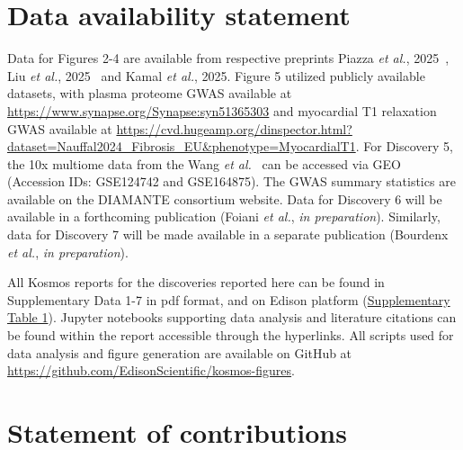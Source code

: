 \documentclass{article}
\begin{document}
\section{Data availability statement}

Data for Figures 2-4 are available from respective preprints Piazza \textit{et al.}, 2025~\cite{piazza_physical_2025}, Liu \textit{et al.}, 2025~\cite{liu_disentangling_2025} and Kamal \textit{et al.}, 2025\cite{kamal_preoptic_2025}. Figure 5 utilized publicly available datasets, with plasma proteome GWAS available at \url{https://www.synapse.org/Synapse:syn51365303} and myocardial T1 relaxation GWAS available at \url{https://cvd.hugeamp.org/dinspector.html?dataset=Nauffal2024_Fibrosis_EU&phenotype=MyocardialT1}. For Discovery 5, the 10x multiome data from the Wang \textit{et al.}~\cite{wang_integrating_2023} can be accessed via GEO (Accession IDs: GSE124742 and GSE164875). The GWAS summary statistics are available on the DIAMANTE consortium website. Data for Discovery 6 will be available in a forthcoming publication (Foiani \textit{et al.}, \textit{in preparation}). Similarly, data for Discovery 7 will be made available in a separate publication (Bourdenx \textit{et al.}, \textit{in preparation}).

All Kosmos reports for the discoveries reported here can be found in Supplementary Data 1-7 in pdf format, and on Edison platform (\hyperref[tab:kosmos_reports_links]{Supplementary Table 1}). Jupyter notebooks supporting data analysis and literature citations can be found within the report accessible through the hyperlinks. All scripts used for data analysis and figure generation are available on GitHub at \href{https://github.com/EdisonScientific/kosmos-figures}{https://github.com/EdisonScientific/kosmos-figures}.

\clearpage

\section{Statement of contributions}
\end{document}
